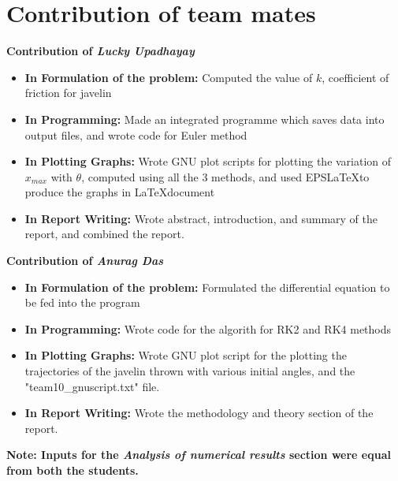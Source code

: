 \documentclass[12pt]{article}
\begin{document}
\section{Contribution of team mates}
\large{\bf {Contribution of {\it Lucky Upadhayay}}}
\begin{itemize}
   \item \textbf{In Formulation of the problem:} Computed the value of $k$, coefficient of friction for javelin 
   \item  \textbf{In Programming:} Made an integrated programme which saves data into output files, and wrote code for Euler method
   \item  \textbf{In Plotting Graphs:} Wrote GNU plot scripts for plotting the variation of $x_{max}$ with $\theta$, computed using all the 3 methods, and used EPS\LaTeX \space to produce the graphs in \LaTeX \space document
   \item  \textbf{In Report Writing:} Wrote abstract, introduction, and summary of the report, and combined the report. 
\end{itemize}
\large{\bf {Contribution of {\it Anurag Das}}}
\begin{itemize}
   \item \textbf{In Formulation of the problem:} Formulated the differential equation to be fed into the program
   \item  \textbf{In Programming:} Wrote code for the algorith for RK2 and RK4 methods
   \item  \textbf{In Plotting Graphs:} Wrote GNU plot script for the plotting the trajectories of the javelin thrown with various initial angles, and the "team10\_gnuscript.txt" file.
   \item  \textbf{In Report Writing:} Wrote the methodology and theory section of the report.
\end{itemize}
\large{\bf {Note: Inputs for the {\it Analysis of numerical results} section were equal from both the students.}}
\end{document}
